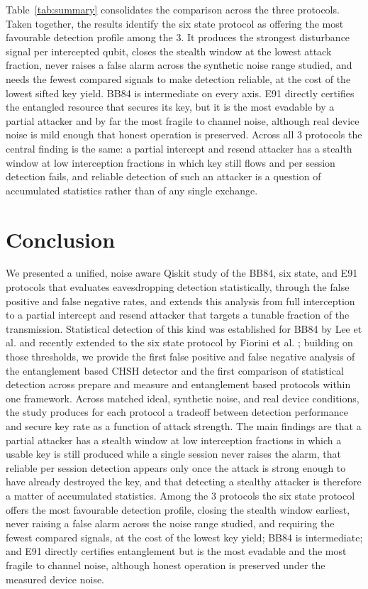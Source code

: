 \documentclass[conference]{IEEEtran}
\begin{document}
Table~\ref{tab:summary} consolidates the comparison across the three protocols.
Taken together, the results identify the six state protocol as offering the most
favourable detection profile among the 3. It produces the strongest
disturbance signal per intercepted qubit, closes the stealth window at the lowest
attack fraction, never raises a false alarm across the synthetic noise range
studied, and needs the fewest compared signals to make detection reliable, at the
cost of the lowest sifted key yield. BB84 is intermediate on every axis. E91
directly certifies the entangled resource that secures its key, but it is the most
evadable by a partial attacker and by far the most fragile to channel noise,
although real device noise is mild enough that honest operation is preserved.
Across all 3 protocols the central finding is the same: a partial intercept
and resend attacker has a stealth window at low interception fractions in which
key still flows and per session detection fails, and reliable detection of such an
attacker is a question of accumulated statistics rather than of any single
exchange.

\section{Conclusion}
We presented a unified, noise aware Qiskit study of the BB84, six state, and E91
protocols that evaluates eavesdropping detection statistically, through the false
positive and false negative rates, and extends this analysis from full
interception to a partial intercept and resend attacker that targets a tunable
fraction of the transmission. Statistical detection of this kind was established
for BB84 by Lee et al. \cite{lee2022eavesdropping} and recently extended to the
six state protocol by Fiorini et al. \cite{fiorini2025sixstate}; building on those
thresholds, we provide the first false positive and false negative analysis of
the entanglement based CHSH detector and the first comparison of statistical
detection across prepare and measure and entanglement based protocols within one
framework. Across matched ideal, synthetic noise, and real device conditions, the
study produces for each protocol a tradeoff between detection performance and
secure key rate as a function of attack strength. The main findings are that a
partial attacker has a stealth window at low interception fractions in which a
usable key is still produced while a single session never raises the alarm, that
reliable per session detection appears only once the attack is strong enough to
have already destroyed the key, and that detecting a stealthy attacker is
therefore a matter of accumulated statistics. Among the 3 protocols the six state
protocol offers the most favourable detection profile, closing the stealth window
earliest, never raising a false alarm across the noise range studied, and
requiring the fewest compared signals, at the cost of the lowest key yield; BB84
is intermediate; and E91 directly certifies entanglement but is the most evadable
and the most fragile to channel noise, although honest operation is preserved
under the measured device noise.
\end{document}
